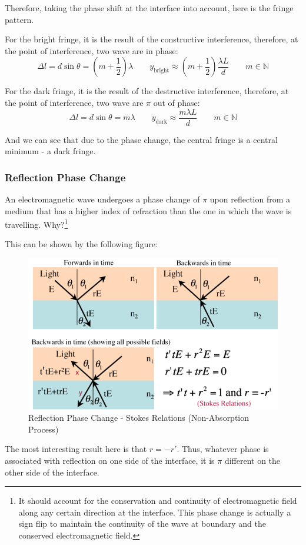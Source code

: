 \documentclass[openany]{book}
\begin{document}
Therefore, taking the phase shift at the interface into account, here is the fringe pattern.

For the bright fringe, it is the result of the constructive interference, therefore, at the point of interference, two wave are in phase:
\[\Delta l=d\sin \theta =\left(m+\frac{1}{2}\right)\lambda \qquad y_{\textrm{bright}}\approx \left(m+\frac{1}{2}\right)\frac{\lambda L}{d}\qquad m\in \mathbb{N}\]

For the dark fringe, it is the result of the destructive interference, therefore, at the point of interference, two wave are $\pi $ out of phase:
\[\Delta l=d\sin \theta =m\lambda \qquad y_{\textrm{dark}}\approx \frac{m\lambda L}{d}\qquad m\in \mathbb{N}\]

And we can see that due to the phase change, the central fringe is a central minimum - a dark fringe. 


\subsubsection{Reflection Phase Change}
An electromagnetic wave undergoes a phase change of $\pi$ upon reflection from a medium that has a higher index of refraction than the one in which the wave is travelling. Why?\footnote{It should account for the conservation and continuity of electromagnetic field along any certain direction at the interface. This phase change is actually a sign flip to maintain the continuity of the wave at boundary and the conserved electromagnetic field.}

This can be shown by the following figure:
\begin{figure}[H]
\centering
\includegraphics[scale=0.4]{Figure/20.PNG}
\caption{Reflection Phase Change - Stokes Relations (Non-Absorption Process)}
\label{fig:20}
\end{figure}
The most interesting result here is that $r=-r'$. Thus, whatever phase is associated with reflection on one side of the interface, it is $\pi$ different on the other side of the interface. 
\end{document}
